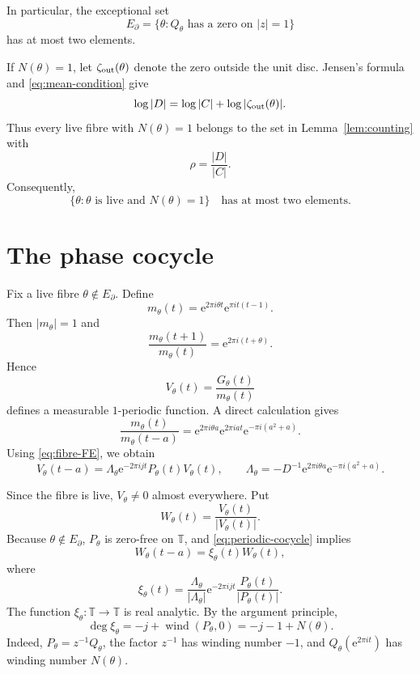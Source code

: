 \documentclass[11pt]{amsart}
\theoremstyle{remark}
\newcommand{\T}{\mathbb T}
\newcommand{\e}{\mathrm e}
\begin{document}
In particular, the exceptional set
\begin{equation}\label{eq:boundary-set}
 E_\partial=\{\theta:Q_\theta\text{ has a zero on }|z|=1\}
\end{equation}
has at most two elements.

If $N(\theta)=1$, let $\zeta_{\rm out}(\theta)$ denote the zero outside the unit disc.
Jensen's formula and \eqref{eq:mean-condition} give
\begin{equation}\label{eq:jensen}
 \log|D|
 =\log|C|+\log|\zeta_{\rm out}(\theta)|.
\end{equation}
Thus every live fibre with $N(\theta)=1$ belongs to the set in
Lemma~\ref{lem:counting} with
\begin{equation}\label{eq:rho}
 \rho=\frac{|D|}{|C|}.
\end{equation}
Consequently,
\begin{equation}\label{eq:N1-finite}
 \{\theta:\theta\text{ is live and }N(\theta)=1\}
 \quad\text{has at most two elements.}
\end{equation}

\section{The phase cocycle}

Fix a live fibre $\theta\notin E_\partial$. Define
\begin{equation}\label{eq:m}
 m_\theta(t)=\e^{2\pi i\theta t}\e^{\pi i t(t-1)}.
\end{equation}
Then $|m_\theta|=1$ and
\[
 \frac{m_\theta(t+1)}{m_\theta(t)}=\e^{2\pi i(t+\theta)}.
\]
Hence
\[
 V_\theta(t)=\frac{G_\theta(t)}{m_\theta(t)}
\]
defines a measurable $1$-periodic function. A direct calculation gives
\[
 \frac{m_\theta(t)}{m_\theta(t-a)}
 =\e^{2\pi i\theta a}\e^{2\pi iat}\e^{-\pi i(a^2+a)}.
\]
Using \eqref{eq:fibre-FE}, we obtain
\begin{equation}\label{eq:periodic-cocycle}
 V_\theta(t-a)=\Lambda_\theta\e^{-2\pi ijt}P_\theta(t)V_\theta(t),
 \qquad
 \Lambda_\theta=-D^{-1}\e^{2\pi i\theta a}\e^{-\pi i(a^2+a)}.
\end{equation}

Since the fibre is live, $V_\theta\ne0$ almost everywhere. Put
\[
 W_\theta(t)=\frac{V_\theta(t)}{|V_\theta(t)|}.
\]
Because $\theta\notin E_\partial$, $P_\theta$ is zero-free on $\T$, and
\eqref{eq:periodic-cocycle} implies
\begin{equation}\label{eq:phase-cocycle}
 W_\theta(t-a)=\xi_\theta(t)W_\theta(t),
\end{equation}
where
\begin{equation}\label{eq:xi}
 \xi_\theta(t)=
 \frac{\Lambda_\theta}{|\Lambda_\theta|}
 \e^{-2\pi ijt}\frac{P_\theta(t)}{|P_\theta(t)|}.
\end{equation}
The function $\xi_\theta:\T\to\T$ is real analytic. By the argument principle,
\begin{equation}\label{eq:degree}
 \deg\xi_\theta
 =-j+\operatorname{wind}(P_\theta,0)
 =-j-1+N(\theta).
\end{equation}
Indeed, $P_\theta=z^{-1}Q_\theta$, the factor $z^{-1}$ has winding number $-1$, and
$Q_\theta(\e^{2\pi i t})$ has winding number $N(\theta)$.
\end{document}
